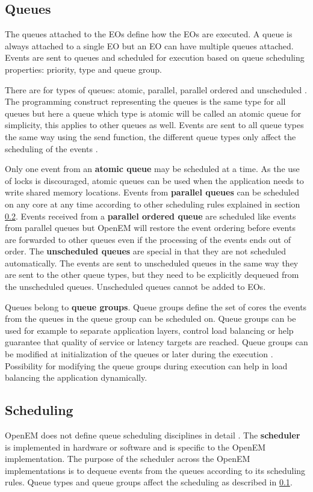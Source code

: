 \subsection{Queues}
\label{subsec:queues}
The queues attached to the EOs define how the EOs are executed. A queue is
always attached to a single EO but an EO can have multiple queues attached.
Events are sent to queues and scheduled for execution based on queue scheduling
properties: priority, type and queue group. \cite{openemintro}

There are for types of queues: atomic, parallel, parallel ordered and
unscheduled \cite{openemintro}. The programming construct representing the
queues is the same type for all queues but here a queue which type is atomic
will be called an atomic queue for simplicity, this applies to other queues as
well. Events are sent to all queue types the same way using the send function,
the different queue types only affect the scheduling of the events
\cite{openemintro}.

Only one event from an \textbf{atomic queue} may be scheduled at a time. As the
use of locks is discouraged, atomic queues can be used when the application
needs to write shared memory locations. Events from \textbf{parallel queues} can
be scheduled on any core at any time according to other scheduling rules
explained in section \ref{subsec:schedule}. Events received from a
\textbf{parallel ordered queue} are scheduled like events from parallel queues
but OpenEM will restore the event ordering before events are forwarded to other
queues even if the processing of the events ends out of order. The
\textbf{unscheduled queues} are special in that they are not scheduled
automatically. The events are sent to unscheduled queues in the same way they
are sent to the other queue types, but they need to be explicitly dequeued from
the unscheduled queues. Unscheduled queues cannot be added to EOs.
\cite{openempage}

Queues belong to \textbf{queue groups}. Queue groups define the set of cores
the events from the queues in the queue group can be scheduled on. Queue groups
can be used for example to separate application layers, control load balancing
or help guarantee that quality of service or latency targets are reached.
\cite{openemintro} Queue groups can be modified at initialization of the queues
or later during the execution \cite{openempage}. Possibility for modifying the
queue groups during execution can help in load balancing the application
dynamically.

\subsection{Scheduling}
\label{subsec:schedule}
OpenEM does not define queue scheduling disciplines in detail
\cite{openempage}. The \textbf{scheduler} is implemented in hardware or
software and is specific to the OpenEM implementation. The purpose of the
scheduler across the OpenEM implementations is to dequeue events from the
queues according to its scheduling rules. \cite{openemintro} Queue types and
queue groups affect the scheduling as described in \ref{subsec:queues}.

